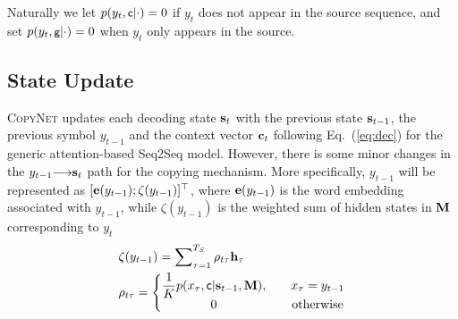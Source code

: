 Naturally we let $p(y_t, \textsf{\small c}|\cdot)=0$ if $y_t$ does not appear in the source sequence, and set $p(y_t, \textsf{\small g}|\cdot)=0$ when $y_t$ only appears in the source. %

 \subsection{State Update}
\label{sec:stateupdate}
\textsc{CopyNet} updates each decoding state $\mathbf{s}_{t}$ with the previous state $\mathbf{s}_{t-1}$, the previous symbol $y_{t-1}$ and the context vector $\mathbf{c}_{t}$  following Eq.~(\ref{eq:dec}) for the generic attention-based Seq2Seq model. However, there is some minor changes in the $y_{t-1}\hspace{-3pt}\longrightarrow \hspace{-3pt}\mathbf{s}_{t}$ path for the copying mechanism. More specifically, $y_{t-1}$ will be represented as $[\mathbf{e}({y_{t-1})} ; \zeta(y_{t-1})]^\top$, where $\mathbf{e}({y_{t-1}})$ is the word embedding associated with $y_{t-1}$, while $\zeta(y_{t-1})$ is the weighted sum of hidden states in $\mathbf{M}$ corresponding to $y_t$ \vspace{-6pt}
\begin{equation}
\label{eq:loc}
\begin{split}
	&\zeta(y_{t-1}) = \sum\nolimits_{\tau=1}^{T_S}\rho_{t\tau} \h_{\tau}\\
	&\rho_{t\tau} = \left \{ \begin{matrix} 
	     \dfrac{1}{K} p(x_\tau, \textsf{c} | \sss_{t-1}, \M),
	     \quad & x_{\tau} = y_{t-1}\\
		0 \quad & \text{otherwise} 
	\end{matrix}\right.
\end{split} \vspace{-7pt}
\end{equation}
